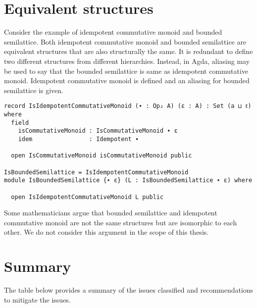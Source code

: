 \section{Equivalent structures}
Consider the example of idempotent commutative monoid and bounded semilattice.
Both idempotent commutative monoid and bounded semilattice are equivalent
structures that are also structurally the same. It is redundant to define two
different structures from different hierarchies. Instead, in Agda, aliasing may
be used to say that the bounded semilattice is same as idempotent commutative
monoid. Idempotent commutative monoid is defined and an aliasing for bounded
semilattice is given.

\begin{verbatim}
record IsIdempotentCommutativeMonoid (∙ : Op₂ A) (ε : A) : Set (a ⊔ ℓ) where
  field
    isCommutativeMonoid : IsCommutativeMonoid ∙ ε
    idem                : Idempotent ∙

  open IsCommutativeMonoid isCommutativeMonoid public

IsBoundedSemilattice = IsIdempotentCommutativeMonoid
module IsBoundedSemilattice {∙ ε} (L : IsBoundedSemilattice ∙ ε) where

  open IsIdempotentCommutativeMonoid L public
\end{verbatim}

Some mathematicians argue that bounded semilattice and idempotent
commutative monoid are not the same structures but are isomorphic to each other.
We do not consider this argument in the scope of this thesis.

\section{Summary}
The table below provides a summary of the issues classified and recommendations
to mitigate the issues.

